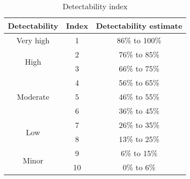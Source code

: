 \begin{table}[!htb]
    \centering
        \begin{tabular}{ ccc }
        \hline
        Detectability & Index & Detectability estimate \\ \hline\hline
        Very high                   & 1  & 86\% to 100\% \\
        \multirow{2}{*}{High}       & 2  & 76\% to 85\% \\
                                    & 3  & 66\% to 75\% \\
        \multirow{3}{*}{Moderate}   & 4  & 56\% to 65\% \\
                                    & 5  & 46\% to 55\%\\
                                    & 6  & 36\% to 45\% \\
        \multirow{2}{*}{Low}        & 7  & 26\% to 35\% \\
                                    & 8  & 13\% to 25\%\\
        \multirow{2}{*}{Minor}      & 9  & 6\% to 15\% \\
                                    & 10 & 0\% to 6\% \\
                                     
        \end{tabular}
        \caption{Detectability index}\label{tab:detectability}
\end{table}






